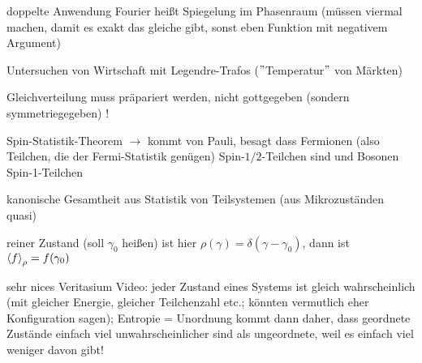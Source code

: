 \documentclass[../KlassMech_main.tex]{subfiles}
\begin{document}
doppelte Anwendung Fourier heißt Spiegelung im Phasenraum (müssen viermal machen, damit es exakt das gleiche gibt, sonst eben Funktion mit negativem Argument)

Untersuchen von Wirtschaft mit Legendre-Trafos ($"$Temperatur$"$ von Märkten)

Gleichverteilung muss präpariert werden, nicht gottgegeben (sondern symmetriegegeben) !

Spin-Statistik-Theorem $\rightarrow$ kommt von Pauli, besagt dass Fermionen (also Teilchen, die der Fermi-Statistik genügen) Spin-$1/2$-Teilchen sind und Bosonen Spin-1-Teilchen


kanonische Gesamtheit aus Statistik von Teilsystemen (aus Mikrozuständen quasi)

reiner Zustand (soll $\gamma_0$ heißen) ist hier $\rho(\gamma) = \delta(\gamma - \gamma_0)$, dann ist $\expval{f}_\rho = f(\gamma_0)$



sehr nices Veritasium Video: jeder Zustand eines Systems ist gleich wahrscheinlich (mit gleicher Energie, gleicher Teilchenzahl etc.; könnten vermutlich eher Konfiguration sagen); Entropie = Unordnung kommt dann daher, dass geordnete Zustände einfach viel unwahrscheinlicher sind als ungeordnete, weil es einfach viel weniger davon gibt!
\end{document}
